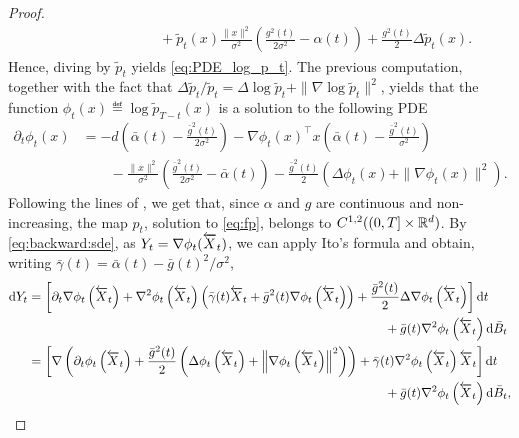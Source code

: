 \documentclass[english,graybox,envcountchap,envcountsame,sectrefs,shortlabels]{svmono}
\theoremstyle{style}
\newcommand{\eqsp}{}
\begin{document}
\begin{proof}
\begin{align*}
     &\hspace{3cm}+ \tilde p_{t}(x)\frac{\|x\|^2}{\sigma^2} \left( \frac{g^2(t)}{2 \sigma^2} - \alpha(t) \right) + \frac{g^2(t)}{2} \Delta \tilde p_{t}(x)\eqsp. 
\end{align*}
Hence, diving by $\tilde p_t$ yields \eqref{eq:PDE_log_p_t}. The previous computation, together with the fact that $\Delta \tilde p_{t}/\tilde p_{t} = \Delta \log \tilde p_{t} + \|\nabla \log \tilde p_{t}\|^2$, yields that the function $\phi_t(x) \eqdef \log \tilde p_{T-t} (x)$ is a solution to the following PDE
\begin{align}\label{eq:PDE_phi_t}
\partial_t \phi_t(x) &= - d \left(  \bar \alpha(t) - \frac{\bar g^2(t)}{2 \sigma^2} \right) -  \nabla \phi_t (x)^\top x \left( \bar \alpha(t) - \frac{\bar g^2(t)}{\sigma^2 } \right)  \\
&\qquad- \frac{ \|x\|^2}{\sigma^2} \left( \frac{\bar g^2(t)}{2 \sigma^2} - \bar \alpha(t) \right) - \frac{\bar g^2(t)}{2} \left( \Delta \phi_t(x) + \| \nabla \phi_t(x)\|^2 \right)\eqsp. 
\end{align}
Following the lines of \cite[Proposition 1]{conforti2023}, we get that, since $\alpha$ and $g$ are continuous and non-increasing, the map $p_t$, solution to \eqref{eq:fp}, belongs to $C^{1,2}((0,T]\times\mathbb{R}^d)$.
By \eqref{eq:backward:sde}, as $Y_t = \nabla\phi_{t}(\overleftarrow X_t)$, we can apply Ito's formula and obtain, writing $\bar \gamma(t) = \bar \alpha(t) - \bar g(t)^2/\sigma^2$,
\begin{align*}
\rmd  Y_t &=
\left[
    \partial_t \nabla \phi_t\left(\ola X_t\right) + \nabla^2 \phi_t\left(\ola X_t\right)\left(    
        \bar\gamma(t)\ola X_t + \bar g^2 (t) \nabla\phi_t\left(\ola X_t\right)
    \right)+
    \frac{\bar g^2(t)}{2} \Delta \nabla \phi_t\left(\ola X_t\right)
\right]\rmd t \\
&\qquad\qquad\qquad\qquad\qquad\qquad
\qquad\qquad\qquad\qquad\qquad\qquad
\qquad\qquad+ \bar g(t) \nabla^2 \phi_t\left(\ola X_t\right) \rmd \bar B_t
\\
&=
\left[\nabla\left(
        \partial_t \phi_t\left(\ola X_t\right)+
        \frac{\bar g^2(t)}{2}\left(\Delta \phi_t\left(\ola X_t\right)+
        \left\|\nabla\phi_t\left(\ola X_t\right)\right\|^2\right)
    \right) + 
    \bar\gamma(t)
    \nabla^2 \phi_t\left(\ola X_t\right) \ola X_t
\right]\rmd t \\
&\qquad\qquad\qquad\qquad\qquad\qquad
\qquad\qquad\qquad\qquad\qquad\qquad
\qquad\qquad + \bar g(t) \nabla^2 \phi_t\left(\ola X_t\right) \rmd \bar B_t\eqsp,

\end{align*}
\end{proof}
\end{document}
